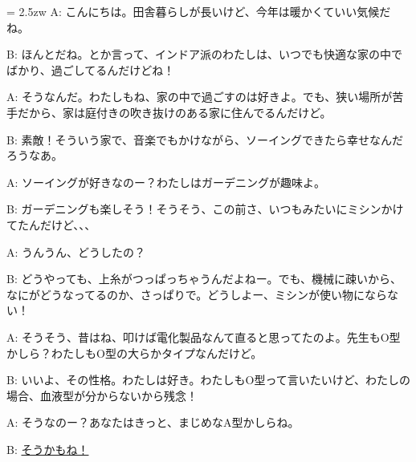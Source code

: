 \documentclass[11pt]{amsart}
\title{}
\author{}
\newenvironment{hangall}[1]{\hangindent = 2.5zw\everypar{\hangindent = 2.5zw}}{}
\begin{document}
\maketitle
\begin{hangall}{}%
A: こんにちは。田舎暮らしが長いけど、今年は暖かくていい気候だね。

B: ほんとだね。とか言って、インドア派のわたしは、いつでも快適な家の中でばかり、過ごしてるんだけどね！

A: そうなんだ。わたしもね、家の中で過ごすのは好きよ。でも、狭い場所が苦手だから、家は庭付きの吹き抜けのある家に住んでるんだけど。

B: 素敵！そういう家で、音楽でもかけながら、ソーイングできたら幸せなんだろうなあ。

A: ソーイングが好きなのー？わたしはガーデニングが趣味よ。

B: ガーデニングも楽しそう！そうそう、この前さ、いつもみたいにミシンかけてたんだけど、、、

A: うんうん、どうしたの？

B: どうやっても、上糸がつっぱっちゃうんだよねー。でも、機械に疎いから、なにがどうなってるのか、さっぱりで。どうしよー、ミシンが使い物にならない！

A: そうそう、昔はね、叩けば電化製品なんて直ると思ってたのよ。先生もO型かしら？わたしもO型の大らかタイプなんだけど。

B: いいよ、その性格。わたしは好き。わたしもO型って言いたいけど、わたしの場合、血液型が分からないから残念！

A: そうなのー？あなたはきっと、まじめなA型かしらね。

B: \ul{そうかもね！}\end{hangall}
\end{document}
